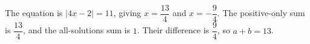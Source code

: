 The equation is $|4x-2|=11$, giving $x=\dfrac{13}{4}$ and $x=-\dfrac{9}{4}$. The positive-only sum is $\dfrac{13}{4}$, and the all-solutions sum is $1$. Their difference is $\dfrac{9}{4}$, so $\boxed{a+b=13}$.

